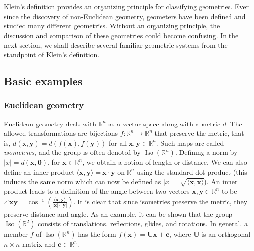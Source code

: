 \documentclass[12pt]{article}
\begin{document}
Klein's definition provides an organizing principle for classifying
geometries.  Ever since the discovery of non-Euclidean geometry,
geometers have been defined and studied many different geometries.
Without an organizing principle, the discussion and comparison of
these geometries could become confusing.  In the next section, we
shall describe several familiar geometric systems from the standpoint
of Klein's definition.

\subsection{Basic examples}
\subsubsection{Euclidean geometry}
Euclidean geometry deals with $\mathbb{R}^n$ as a vector space along with a metric $d$. The allowed transformations are 
bijections $f\colon \mathbb{R}^n \to \mathbb{R}^n$ that preserve the metric, that is, $d(\boldsymbol{x},\boldsymbol{y}) 
= d(f(\boldsymbol{x}),f(\boldsymbol{y}))$ for all $\boldsymbol{x},\boldsymbol{y} \in \mathbb{R}^n$. Such maps are called 
\emph{isometries}, and the group is often denoted by $\operatorname{Iso}(\mathbb{R}^n)$. Defining a norm by $|x| = 
d(\boldsymbol{x},\boldsymbol{0})$, for $\boldsymbol{x} \in \mathbb{R}^n$, we obtain a notion of length or distance.
We can also define an inner product $\langle \boldsymbol{x},\boldsymbol{y}\rangle = \boldsymbol{x} \cdot \boldsymbol{y}$ on $\mathbb{R}^n$ using the standard dot
product (this induces the same norm which can now be defined as
$|x| = \sqrt{\langle \boldsymbol{x},\boldsymbol{x}\rangle}$).
An inner product leads to a definition of
the angle between two vectors $\boldsymbol{x},\boldsymbol{y} \in \mathbb{R}^n$ to be 
$\displaystyle \angle{\boldsymbol{x}}{\boldsymbol{y}} = \cos^{-1}\left(\frac{\langle \boldsymbol{x},\boldsymbol{y}\rangle}
{|\boldsymbol{x}| \cdot |\boldsymbol{y}|}\right).$  It is clear that since isometries preserve the metric, they preserve distance and angle. As an example, it can be shown 
that the group $\operatorname{Iso}(\mathbb{R}^2)$ consists of translations, reflections, glides, and rotations.  In 
general, a member $f$ of $\operatorname{Iso}(\mathbb{R}^n)$ has the form $f(\boldsymbol{x})=\boldsymbol{Ux}+
\boldsymbol{c}$, where $\boldsymbol{U}$ is an orthogonal $n\times n$ matrix and $\boldsymbol{c}\in\mathbb{R}^n$.
\end{document}
